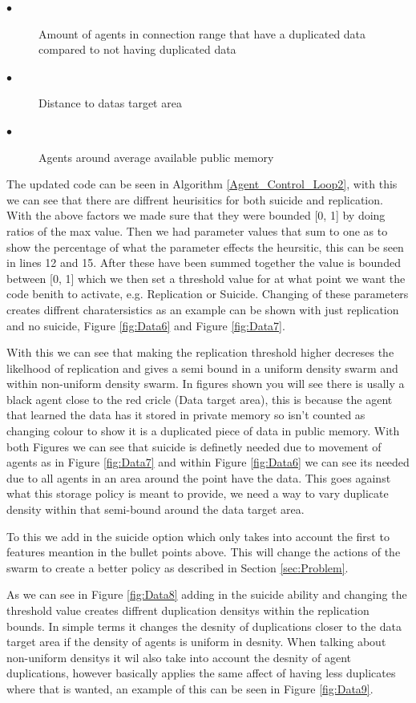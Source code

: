 \documentclass{UoYCSproject}
\begin{document}
\begin{description}
\item[$\bullet$] Amount of agents in connection range that have a duplicated data compared to not having duplicated data
\item[$\bullet$] Distance to datas target area
\item[$\bullet$] Agents around average available public memory
\end{description}

The updated code can be seen in Algorithm \ref{Agent_Control_Loop2}, with this we can see that there are diffrent heurisitics for both suicide and replication.
With the above factors we made sure that they were bounded [0, 1] by doing ratios of the max value.
Then we had parameter values that sum to one as to show the percentage of what the parameter effects the heursitic, this can be seen in lines 12 and 15.
After these have been summed together the value is bounded between [0, 1] which we then set a threshold value for at what point we want the code benith to activate, e.g. Replication or Suicide.
Changing of these parameters creates diffrent charatersistics as an example can be shown with just replication and no suicide, Figure \ref{fig:Data6} and Figure \ref{fig:Data7}.

With this we can see that making the replication threshold higher decreses the likelhood of replication and gives a semi bound in a uniform density swarm and within non-uniform density swarm.
In figures shown you will see there is usally a black agent close to the red cricle (Data target area), this is because the agent that learned the data has it stored in private memory so isn't counted as changing colour to show it is a duplicated piece of data in public memory.
With both Figures we can see that suicide is definetly needed due to movement of agents as in Figure \ref{fig:Data7} and within Figure \ref{fig:Data6} we can see its needed due to all agents in an area around the point have the data.
This goes against what this storage policy is meant to provide, we need a way to vary duplicate density within that semi-bound around the data target area.

To this we add in the suicide option which only takes into account the first to features meantion in the bullet points above.
This will change the actions of the swarm to create a better policy as described in Section \ref{sec:Problem}.

As we can see in Figure \ref{fig:Data8} adding in the suicide ability and changing the threshold value creates diffrent duplication densitys within the replication bounds.
In simple terms it changes the desnity of duplications closer to the data target area if the density of agents is uniform in desnity.
When talking about non-uniform densitys it wil also take into account the desnity of agent duplications, however basically applies the same affect of having less duplicates where that is wanted, an example of this can be seen in Figure \ref{fig:Data9}.
\end{document}
